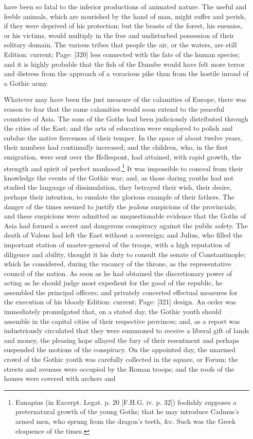 have been so fatal to the inferior productions of animated nature. The useful and feeble animals, which are nourished by the hand of man, might suffer and perish, if they were deprived of his protection; but the beasts of the forest, his enemies, or his victims, would multiply in the free and undisturbed possession of their solitary domain. The various tribes that people the air, or the waters, are still Edition: current; Page: [320] less connected with the fate of the human species; and it is highly probable that the fish of the Danube would have felt more terror and distress from the approach of a voracious pike than from the hostile inroad of a Gothic army.

Whatever may have been the just measure of the calamities of Europe, there was reason to fear that the same calamities would soon extend to the peaceful countries of Asia. The sons of the Goths had been judiciously distributed through the cities of the East; and the arts of education were employed to polish and subdue the native fierceness of their temper. In the space of about twelve years, their numbers had continually increased; and the children, who, in the first emigration, were sent over the Hellespont, had attained, with rapid growth, the strength and spirit of perfect manhood.\footnote{Eunapius (in Excerpt. Legat. p. 20 [F.H.G. iv. p. 32]) foolishly supposes a preternatural growth of the young Goths; that he may introduce Cadmus\texthebrew{}’s armed men, who sprung from the dragon\texthebrew{}’s teeth, \&c. Such was the Greek eloquence of the times.} It was impossible to conceal from their knowledge the events of the Gothic war; and, as those daring youths had not studied the language of dissimulation, they betrayed their wish, their desire, perhaps their intention, to emulate the glorious example of their fathers. The danger of the times seemed to justify the jealous suspicions of the provincials; and these suspicions were admitted as unquestionable evidence that the Goths of Asia had formed a secret and dangerous conspiracy against the public safety. The death of Valens had left the East without a sovereign; and Julius, who filled the important station of master-general of the troops, with a high reputation of diligence and ability, thought it his duty to consult the senate of Constantinople; which he considered, during the vacancy of the throne, as the representative council of the nation. As soon as he had obtained the discretionary power of acting as he should judge most expedient for the good of the republic, he assembled the principal officers; and privately concerted effectual measures for the execution of his bloody Edition: current; Page: [321] design. An order was immediately promulgated that, on a stated day, the Gothic youth should assemble in the capital cities of their respective provinces; and, as a report was industriously circulated that they were summoned to receive a liberal gift of lands and money, the pleasing hope allayed the fury of their resentment and perhaps suspended the motions of the conspiracy. On the appointed day, the unarmed crowd of the Gothic youth was carefully collected in the square, or Forum; the streets and avenues were occupied by the Roman troops; and the roofs of the houses were covered with archers and 